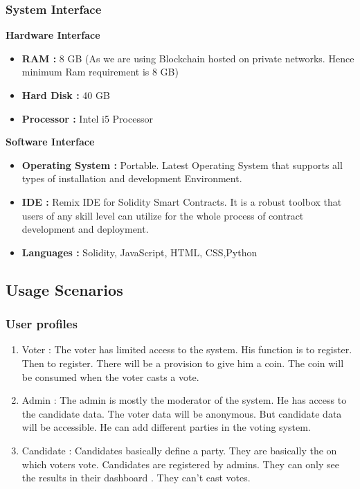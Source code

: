 \documentclass[oneside, 12pt]{book}
\begin{document}
			\subsubsection{System Interface}
				\textbf{Hardware Interface}
					\begin{itemize}
						\item\textbf{RAM :} 8 GB (As we are using Blockchain hosted on private networks. Hence  minimum Ram requirement is 8 GB)
						\item\textbf{Hard Disk :} 40 GB
						\item\textbf{Processor :} Intel i5 Processor
					\end{itemize}
				\textbf{Software Interface}
					\begin{itemize}
						\item\textbf{Operating System :} Portable. Latest Operating System that supports all types of installation and development Environment.
						\item\textbf{IDE :} Remix IDE for Solidity Smart Contracts. It is a robust toolbox that users of any skill level can utilize for the whole process of contract development and deployment. 
						\item\textbf{Languages :} Solidity, JavaScript, HTML, CSS,Python
					\end{itemize}
		\subsection{Usage Scenarios}
			\subsubsection{User profiles}
				\begin{enumerate}
					\item Voter : The voter has limited access to the system. His function is to register. Then to register. There will be a provision to give him a coin. The coin will be consumed when the voter casts a vote. 
					\item Admin : The admin is mostly the moderator of the system. He has access to the candidate data. The voter data will be anonymous. But candidate data will be accessible. He can add different parties in the voting system.
					\item Candidate : Candidates basically define a party. They are basically the on which voters vote. Candidates are registered by admins. They can only see the results in their dashboard . They can’t cast votes.
				\end{enumerate}
\end{document}
